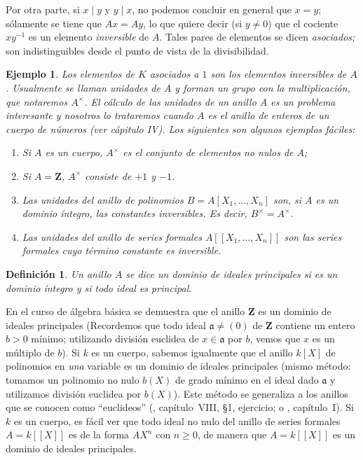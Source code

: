 \documentclass[bibtotoc,leqno,spanish]{amsbook}
\newcommand{\ZZ}{\mathbf{Z}}
\newcommand{\idl}[1]{\mathfrak{#1}}
\numberwithin{equation}{section}
\theoremstyle{note}
\newtheorem{definition}{Definici\'on}
\theoremstyle{note}
\theoremstyle{rem}
\newtheorem*{example*}{Ejemplo}
\numberwithin{theorem}{section}
\numberwithin{proposition}{section}
\numberwithin{definition}{section}
\numberwithin{lemma}{section}
\numberwithin{corollary}{section}
\numberwithin{example}{section}
\numberwithin{footnote}{section}%
\begin{document}
Por otra parte, si $x\mid y$ y $y\mid x$, no podemos concluir en general que $x = y$; s\'olamente
se tiene que $Ax = Ay$, lo que quiere decir (si $y\neq 0$) que el cociente $xy^{-1}$ es un
elemento \emph{inversible} de $A$. Tales pares de elementos se dicen \emph{asociados;} son indistinguibles desde
el punto de vista de la divisibilidad.

\begin{example*}
Los elementos de $K$ asociados a $1$ son los elementos inversibles de $A$. Usualmente se llaman
\emph{unidades} de $A$ y forman un grupo con la multiplicaci\'on, que notaremos $A^{\times}$. El c\'alculo
de las unidades de un anillo $A$ es un problema interesante y nosotros lo trataremos cuando
$A$ es el anillo de enteros de un cuerpo de n\'umeros (ver c\'apitulo IV). Los siguientes son algunos
ejemplos f\'aciles:
\begin{enumerate}
\item[a)] Si $A$ es un cuerpo, $A^{\times}$ es el conjunto de elementos no nulos de $A$;
\item[b)] Si $A = \ZZ$, $A^{\times}$ consiste de $+1$ y $-1$.
\item[c)] Las unidades del anillo de polinomios $B = A[X_{1},\dots,X_{n}]$ son, si $A$ es un dominio
\'integro, las constantes inversibles. Es decir, $B^{\times} = A^{\times}$.
\item[d)] Las unidades del anillo de series formales $A[[X_{1},\dots,X_{n}]]$ son las series formales
cuyo t\'ermino constante es inversible.
\end{enumerate}
\end{example*}

\begin{definition}
Un anillo $A$ se dice un dominio de ideales principales si es un dominio \'integro y si todo ideal
es principal.
\end{definition}

En el curso de \'algebra b\'asica se demuestra que el anillo $\ZZ$ es un dominio de ideales
principales (Recordemos que todo ideal $\idl{a}\neq(0)$ de $\ZZ$ contiene un
entero $b > 0$ m\'inimo; utilizando divisi\'on euclidea de $x\in\idl{a}$ por $b$,
vemos que $x$ es un m\'ultiplo de $b$). Si $k$ es un cuerpo, sabemos igualmente
que el anillo $k[X]$ de polinomios en \emph{una} variable es un dominio de
ideales principales (mismo m\'etodo: tomamos un polinomio no nulo $b(X)$ de grado
m\'inimo en el ideal dado $\idl{a}$ y utilizamos divisi\'on euclidea por $b(X)$).
Este m\'etodo se generaliza a los anillos que se conocen como ``euclideos''
(\cite{Bourbaki1}, cap\'itulo~VIII, \S1, ejercicio; o \cite{ZariskiSamuel}, cap\'itulo~I).
Si $k$ es un cuerpo, es f\'acil ver que todo ideal no nulo del anillo de
series formales $A = k[[X]]$ es de la forma $AX^{n}$ con $n \geq 0$, de manera
que $A = k[[X]]$ es un dominio de ideales principales.
\end{document}
